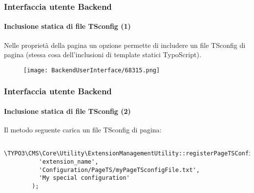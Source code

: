 \begin{frame}[fragile]
	\frametitle{Interfaccia utente Backend}
	\framesubtitle{Inclusione statica di file TSconfig (1)}

	Nelle proprietà della pagina un opzione permette di includere un file TSconfig di pagina
	(stessa cosa dell'inclusioni di template statici TypoScript).

	\begin{figure}
		\texttt{[image: BackendUserInterface/68315.png]}
	\end{figure}

\end{frame}

\begin{frame}[fragile]
	\frametitle{Interfaccia utente Backend}
	\framesubtitle{Inclusione statica di file TSconfig (2)}

	\lstset{basicstyle=\tiny\ttfamily}

	Il metodo seguente carica un file TSconfig di pagina:

	\begin{lstlisting}
		\TYPO3\CMS\Core\Utility\ExtensionManagementUtility::registerPageTSConfigFile(
		  'extension_name',
		  'Configuration/PageTS/myPageTSconfigFile.txt',
		  'My special configuration'
		);
	\end{lstlisting}

\end{frame}


